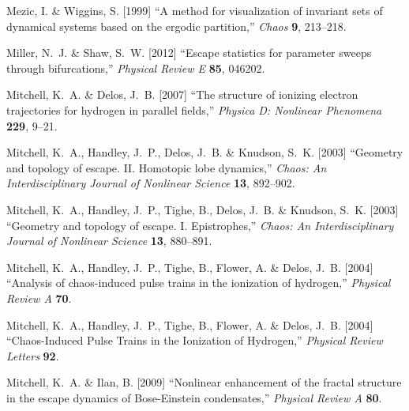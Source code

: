 \documentclass{ws-ijbc}
\begin{document}
\begin{thebibliography}{76}
	Mezic, I. \& Wiggins, S. [1999] \enquote{{A method for visualization of
			invariant sets of dynamical systems based on the ergodic partition},}
	\emph{Chaos} \textbf{9},  213--218.
	
	Miller, N.~J. \& Shaw, S.~W. [2012] \enquote{Escape statistics for parameter
		sweeps through bifurcations,} \emph{Physical Review E} \textbf{85},  046202.
	
	Mitchell, K.~A. \& Delos, J.~B. [2007] \enquote{The structure of ionizing
		electron trajectories for hydrogen in parallel fields,} \emph{Physica D:
		Nonlinear Phenomena} \textbf{229},  9--21.
	
	Mitchell, K.~A., Handley, J.~P., Delos, J.~B. \& Knudson, S.~K.
	[2003{}] \enquote{Geometry and topology of escape. {II}.
		{Homotopic} lobe dynamics,} \emph{Chaos: An Interdisciplinary Journal of
		Nonlinear Science} \textbf{13},  892--902.
	
	Mitchell, K.~A., Handley, J.~P., Tighe, B., Delos, J.~B. \& Knudson, S.~K.
	[2003{}] \enquote{Geometry and topology of escape. {I}.
		{Epistrophes},} \emph{Chaos: An Interdisciplinary Journal of Nonlinear
		Science} \textbf{13},  880--891.
	
	Mitchell, K.~A., Handley, J.~P., Tighe, B., Flower, A. \& Delos, J.~B.
	[2004{}] \enquote{Analysis of chaos-induced pulse trains in the
		ionization of hydrogen,} \emph{Physical Review A} \textbf{70}.
	
	Mitchell, K.~A., Handley, J.~P., Tighe, B., Flower, A. \& Delos, J.~B.
	[2004{}] \enquote{Chaos-{Induced} {Pulse} {Trains} in the
		{Ionization} of {Hydrogen},} \emph{Physical Review Letters} \textbf{92}.
	
	Mitchell, K.~A. \& Ilan, B. [2009] \enquote{Nonlinear enhancement of the
		fractal structure in the escape dynamics of {Bose}-{Einstein} condensates,}
	\emph{Physical Review A} \textbf{80}.
	

\end{thebibliography}
\end{document}
